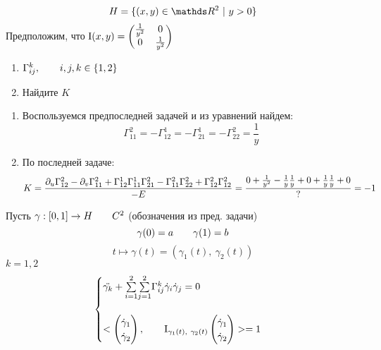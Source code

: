\documentclass[main]{subfiles}
\begin{document}

    \begin{Task}
        \[H = \{(x,y) \in \R^2 \ |\ y > 0\}\]
        Предположим, что $\RNumb{1}(x,y) = \begin{pmatrix}
            \frac{1}{y^2} & 0\\
            0 & \frac{1}{y^2}
        \end{pmatrix}$
        \begin{enumerate}
          \item $\Gamma_{ij}^k,\qquad i,j,k \in \{1,2\}$
          \item Найдите $K$
        \end{enumerate}
    \end{Task}

    \begin{sol}
        \begin{enumerate}
          \item Воспользуемся предпоследней задачей и из уравнений найдем:
          \[\Gamma_{11}^2 = - \Gamma_{12}^1 = -\Gamma_{21}^1 = -\Gamma_{22}^2 = \frac{1}{y}\]
          \item По последней задаче:
          \[K = \frac{\partial_u \Gamma_{12}^2 - \partial_v \Gamma_{11}^2 + \Gamma_{12}^1 \Gamma_{11}^1 \Gamma_{21}^2 - \Gamma_{11}^2 \Gamma_{22}^2 + \Gamma_{12}^2 \Gamma_{12}^2}{-E} = \frac{0 + \frac{1}{y^2} - \frac{1}{y} \frac{1}{y} + 0 + \frac{1}{y} \frac{1}{y} + 0}{?} = -1\]
        \end{enumerate}
    \end{sol}

    \begin{task}
        Пусть $\gamma: [0,1] \rightarrow H \qquad C^2$ (обозначения из пред. задачи)
        \[\gamma(0) = a \qquad \gamma(1) = b\]
        \[t \mapsto \gamma(t) = (\gamma_1(t),\ \gamma_2(t))\]
        $k=1,2$
        \[\begin{cases}
          \ddot{\gamma_k} + \us{i=1}{\os{2}{\sum}} \us{j=1}{\os{2}{\sum}} \Gamma_{ij}^k \dot{\gamma}_i \dot{\gamma}_j = 0\\ \\
          <\begin{pmatrix}
            \dot{\gamma}_1\\
            \dot{\gamma}_2
          \end{pmatrix}, \qq \RNumb{1}_{\gamma_1(t),\ \gamma_2(t)} \begin{pmatrix}
            \dot{\gamma}_1\\
            \dot{\gamma}_2
          \end{pmatrix}> = 1
        \end{cases}\]
    \end{task}
\end{document}
